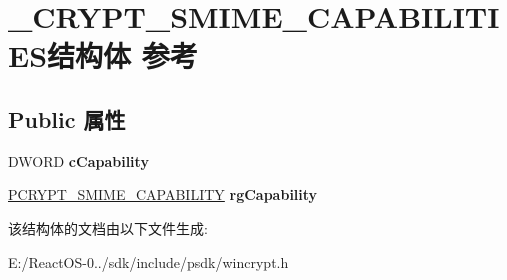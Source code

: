 \hypertarget{struct___c_r_y_p_t___s_m_i_m_e___c_a_p_a_b_i_l_i_t_i_e_s}{}\section{\+\_\+\+C\+R\+Y\+P\+T\+\_\+\+S\+M\+I\+M\+E\+\_\+\+C\+A\+P\+A\+B\+I\+L\+I\+T\+I\+E\+S结构体 参考}
\label{struct___c_r_y_p_t___s_m_i_m_e___c_a_p_a_b_i_l_i_t_i_e_s}
\subsection*{Public 属性}
\begin{DoxyCompactItemize}
\item 
\mbox{\label{struct___c_r_y_p_t___s_m_i_m_e___c_a_p_a_b_i_l_i_t_i_e_s_a5f0d3ad7ca5985f95f925557e14ee286}} 
D\+W\+O\+RD {\bfseries c\+Capability}
\item 
\mbox{\label{struct___c_r_y_p_t___s_m_i_m_e___c_a_p_a_b_i_l_i_t_i_e_s_a6bd09047e8b2fe1790330238f9df1ede}} 
\hyperlink{struct___c_r_y_p_t___s_m_i_m_e___c_a_p_a_b_i_l_i_t_y}{P\+C\+R\+Y\+P\+T\+\_\+\+S\+M\+I\+M\+E\+\_\+\+C\+A\+P\+A\+B\+I\+L\+I\+TY} {\bfseries rg\+Capability}
\end{DoxyCompactItemize}


该结构体的文档由以下文件生成\+:\begin{DoxyCompactItemize}
\item 
E\+:/\+React\+O\+S-\/0../sdk/include/psdk/wincrypt.\+h\end{DoxyCompactItemize}
